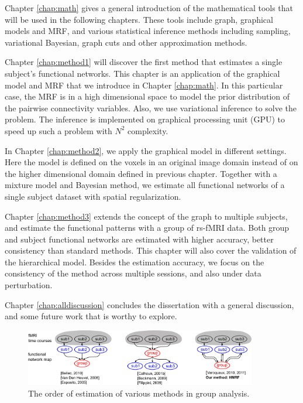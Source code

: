 Chapter \ref{chap:math} gives a general introduction of the mathematical tools
that will be used in the following chapters. These tools include graph,
graphical models and MRF, and various statistical inference methods including
sampling, variational Bayesian, graph cuts and other approximation methods.

Chapter \ref{chap:method1} will discover the first method that estimates a single
subject's functional networks. This chapter is an application of the graphical
model and MRF that we introduce in Chapter \ref{chap:math}. In this particular
case, the MRF is in a high dimensional space to model the prior distribution of
the pairwise connectivity variables. Also, we use variational inference to solve
the problem. The inference is implemented on graphical processing unit (GPU) to
speed up such a problem with $N^2$ complexity.

In Chapter \ref{chap:method2}, we apply the graphical model in  different
settings. Here the model is defined on the voxels in an original image domain
instead of on the higher dimensional domain defined in previous chapter. Together with a
mixture model and Bayesian method, we estimate all functional networks of a
single subject dataset with spatial regularization.

Chapter \ref{chap:method3} extends the concept of the graph to multiple
subjects, and estimate the functional patterns with a group of rs-fMRI
data. Both group and subject functional networks are estimated with higher
accuracy, better consistency than standard methods. This chapter will also cover
the validation of the hierarchical model. Besides the estimation accuracy, we
focus on the consistency of the method across multiple sessions, and also under
data perturbation.

Chapter \ref{chap:alldiscussion} concludes the dissertation with a general
discussion, and some future work that is worthy to explore.

\begin{figure}[p]
  \centering
  \includegraphics[width=0.9\textwidth]{figures/c1/bidirections}
  \caption{The order of estimation of various methods in group analysis.}
  \label{fig:bidirections}
\end{figure}

